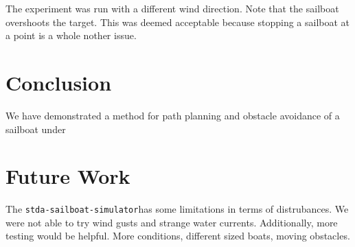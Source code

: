 \documentclass[conference]{IEEEtran}
\newcommand{\Sim}{\lstinline{stda-sailboat-simulator}}
\begin{document}
The experiment was run with a different wind direction. Note that the sailboat overshoots the target. This was deemed acceptable because stopping a sailboat at a point is a whole nother issue.




\section{Conclusion}
We have demonstrated a method for path planning and obstacle avoidance of a sailboat under
\section{Future Work}
The \Sim has some limitations in terms of distrubances. We were not able to try wind gusts and strange water currents. Additionally, more testing would be helpful. More conditions, different sized boats, moving obstacles.



\end{document}

